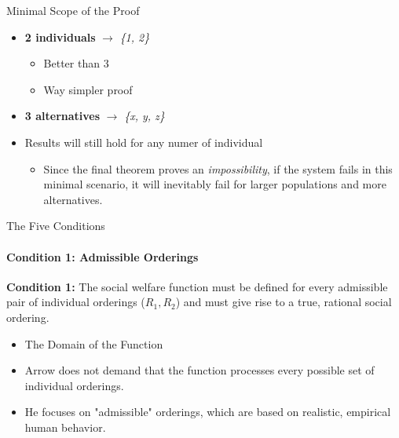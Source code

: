 \documentclass{beamer}
\begin{document}
\begin{frame}{Minimal Scope of the Proof}
    \begin{itemize}
        \item \textbf{2 individuals} $\rightarrow$ \textit{\{1, 2\}}
        \begin{itemize}
            \item Better than 3
            \item Way simpler proof
        \end{itemize}
        \vspace{0.25 cm}
        \item \textbf{3 alternatives} $\rightarrow$ \textit{\{x, y, z\}}
        \vspace{0.25 cm}
        \item Results will still hold for any numer of individual
        \begin{itemize}
            \item[$\Rightarrow$]  Since the final theorem proves an \textit{impossibility}, if the system fails in this minimal scenario, it will inevitably fail for larger populations and more alternatives.
        \end{itemize}
    \end{itemize}

\end{frame}

\begin{frame}{The Five Conditions}
    \framesubtitle{Condition 1: Admissible Orderings}
    \textbf{Condition 1:} The social welfare function must be defined for every admissible pair of individual orderings ($R_1, R_2$) and must give rise to a true, rational social ordering.
    \begin{itemize}
        \item[$\Rightarrow$] The Domain of the Function
    \end{itemize}
    \begin{itemize}
        \vspace{0.5 cm}
        \item Arrow does not demand that the function processes every possible set of individual orderings.
        \item He focuses on "admissible" orderings, which are based on realistic, empirical human behavior.
        
    \end{itemize}
\end{frame}
\end{document}
